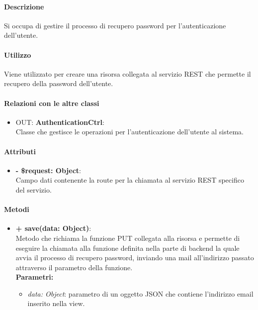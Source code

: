 		\paragraph{Descrizione}
		Si occupa di gestire il processo di recupero password per l'autenticazione dell'utente.
		
		\paragraph{Utilizzo}
		Viene utilizzato per creare una risorsa collegata al servizio REST che permette il recupero della password dell'utente.
		
		\paragraph{Relazioni con le altre classi}
		\begin{itemize}
			\item OUT: \textbf{AuthenticationCtrl}:\\
			Classe che gestisce le operazioni per l'autenticazione dell'utente al sistema.
		\end{itemize}
		
		\paragraph{Attributi}
		\begin{itemize}
			\item \textbf{- \$request: Object}:\\
			Campo dati contenente la route per la chiamata al servizio REST specifico del servizio.
		\end{itemize}	
		
		\paragraph{Metodi}
		\begin{itemize}
			\item \textbf{+ save(data: Object)}:\\
			Metodo che richiama la funzione PUT collegata alla risorsa e permette di eseguire la chiamata alla funzione definita nella parte di backend la quale avvia il processo di recupero password, inviando una mail all'indirizzo passato attraverso il parametro della funzione.\\
			\textbf{Parametri:}\\
			\begin{itemize}
				\item \textit{data: Object}: parametro di un oggetto JSON che contiene l'indirizzo email inserito nella view.
			\end{itemize}
		\end{itemize}
\newpage
		
